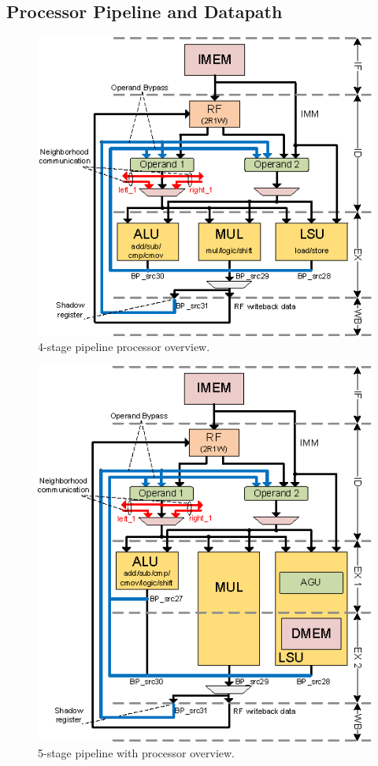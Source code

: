 
\subsection{Processor Pipeline and Datapath}\label{sec:processor}
\begin{figure}[t!]
\centering
\includegraphics[width=.5\textwidth]{figures/4-stage_bypass}
\caption{4-stage pipeline processor overview.}
\label{fig:4_stage}
\end{figure}

\begin{figure}[b!]
\centering
\includegraphics[width=.5\textwidth]{figures/5-stage_bypass}
\caption{5-stage pipeline with processor overview.}
\label{fig:5_stage}
\end{figure}

